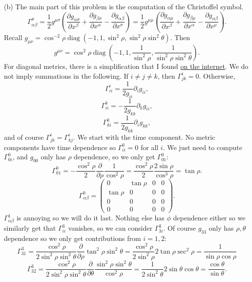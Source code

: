 \documentclass[11pt, letterpaper]{article}
\theoremstyle{plain}
\begin{document}
(b) The main part of this problem is the computation of the Christoffel symbol.
\[
	\Gamma^\mu _{\alpha \beta } =\frac{1}{2} g^{\mu \sigma } \left( \frac{\partial g_{\alpha \sigma } }{\partial x^\beta } +\frac{\partial g_{\beta \sigma } }{\partial x^\alpha } -\frac{\partial g_{\alpha \beta } }{\partial x^\sigma }  \right) =\frac{1}{2} g^{\mu \mu } \left( \frac{\partial g_{\alpha \mu } }{\partial x^\beta } +\frac{\partial g_{\beta \mu } }{\partial x^\alpha } -\frac{\partial g_{\alpha \beta } }{\partial x^\mu }  \right) 
.\]
Recall $g_{\mu \nu } =\cos ^{-2} \rho \operatorname{diag} (-1,1,\sin ^2\rho ,\sin ^2\rho \sin ^2\theta )$. Then
\[
	g^{\mu \nu }=\cos ^2\rho \operatorname{diag} \left( -1,1,\frac{1}{\sin ^2\rho } ,\frac{1}{\sin ^2\rho \sin ^2\theta }  \right) 
.\]
For diagonal metrics, there is a simplification that I found \href{https://math.stackexchange.com/a/4570548}{on the internet}. We do not imply summations in the following. If $i\neq j\neq k$, then $\Gamma ^i_{jk} =0$. Otherwise,
\[
	\Gamma^i_{ii} =\frac{1}{2g_{ii} } \partial_i g_{ii} ,
\]
\[
	\Gamma^k_{ii} =-\frac{1}{2g_{kk} } \partial_kg_{ii} ,
\]
\[
	\Gamma^k_{ki} =\frac{1}{2g_{kk} } \partial _ig_{kk} 
,\]
and of course $\Gamma ^i_{jk} =\Gamma ^i_{kj} $. We start with the time component. No metric components have time dependence so $\Gamma ^0_{ii} =0$ for all $i$. We just need to compute $\Gamma ^0_{0i} $, and $g_{00} $ only has $\rho $ dependence, so we only get $\Gamma ^0_{01} $:
\[
	\Gamma ^0_{01} =-\frac{\cos ^2\rho }{2} \frac{\partial }{\partial \rho } \frac{1}{\cos ^2\rho } =\frac{\cos ^2\rho }{2} \frac{2 \sin \rho }{\cos ^3\rho } =\tan \rho 
.\]
\[
	\Gamma^0_{\alpha \beta } =\begin{pmatrix}
	0 & \tan \rho  & 0 & 0 \\
	\tan \rho  & 0 & 0 & 0 \\
	0 & 0 & 0 & 0 \\
	0 & 0 & 0 & 0
	\end{pmatrix}
.\]
$\Gamma ^1_{\alpha \beta } $ is annoying so we will do it last. Nothing else has $\phi $ dependence either so we similarly get that $\Gamma ^3_{ii} $ vanishes, so we can consider $\Gamma ^3_{3i} $. Of course $g_{33} $ only has $\rho ,\theta $ dependence so we only get contributions from $i=1,2$:
\[
	\Gamma ^3_{31} =\frac{\cos ^2\rho }{2 \sin ^2\rho \sin ^2\theta } \frac{\partial }{\partial \rho } \tan ^2\rho \sin ^2\theta =\frac{\cos ^2\rho }{2 \sin ^2\rho } 2 \tan \rho \sec ^2\rho =\frac{1}{\sin \rho \cos \rho } 
\]
\[
	\Gamma ^3_{32} =\frac{\cos ^2\rho }{2 \sin ^2\rho \sin ^2\theta } \frac{\partial }{\partial \theta } \frac{\sin ^2\rho \sin ^2\theta }{\cos ^2\rho } =\frac{1}{2 \sin ^2\theta } 2 \sin \theta \cos \theta =\frac{\cos \theta }{\sin \theta } 
.\]
\end{document}
